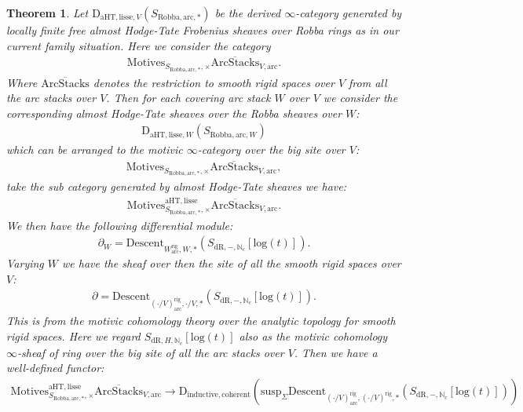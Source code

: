 \documentclass[12pt]{article}
\newtheorem{theorem}{Theorem}
\theoremstyle{definition}
\begin{document}
\begin{theorem}\label{theorem59}
Let $\mathrm{D}_{\mathrm{aHT},\mathrm{lisse},V}(S_{\mathrm{Robba},\mathrm{arc},*})$ be the derived $\infty$-category generated by locally finite free almost Hodge-Tate Frobenius sheaves over Robba rings as in our current family situation. Here we consider the category 
\begin{align}
\mathrm{Motives}_{S_{\mathrm{Robba},\mathrm{arc},*},\times}\overline{\mathrm{ArcStacks}}_{V,\mathrm{arc}}.
\end{align}
Where $\overline{\mathrm{ArcStacks}}$ denotes the restriction to smooth rigid spaces over $V$ from all the arc stacks over $V$. Then for each covering arc stack $W$ over $V$ we consider the corresponding almost Hodge-Tate sheaves over the Robba sheaves over $W$:
\begin{align}
\mathrm{D}_{\mathrm{aHT},\mathrm{lisse},W}(S_{\mathrm{Robba},\mathrm{arc},W})
\end{align}
which can be arranged to the motivic $\infty$-category over the big site over $V$:
\begin{align}
\mathrm{Motives}_{S_{\mathrm{Robba},\mathrm{arc},*},\times}\overline{\mathrm{ArcStacks}}_{V,\mathrm{arc}},
\end{align}
take the sub category generated by almost Hodge-Tate sheaves we have:
\begin{align}
\mathrm{Motives}^{\mathrm{aHT},\mathrm{lisse}}_{S_{\mathrm{Robba},\mathrm{arc},*},\times}\overline{\mathrm{ArcStacks}}_{V,\mathrm{arc}}.
\end{align}
We then have the following differential module:
\begin{align}
\partial_W=\mathrm{Descent}_{W^\mathrm{rig}_\mathrm{arc},W,*}(S_{\mathrm{dR},-,\mathbb{N}_c}[\mathrm{log}(t)]).
\end{align}
Varying $W$ we have the sheaf over then the site of all the smooth rigid spaces over $V$:
\begin{align}
\partial=\mathrm{Descent}_{(\cdot/V)^\mathrm{rig}_\mathrm{arc},\cdot/V,*}(S_{\mathrm{dR},-,\mathbb{N}_c}[\mathrm{log}(t)]).
\end{align}
This is from the motivic cohomology theory over the analytic topology for smooth rigid spaces. Here we regard $S_{\mathrm{dR},H,\mathbb{N}_c}[\mathrm{log}(t)]$ also as the motivic cohomology $\infty$-sheaf of ring over the big site of all the arc stacks over $V$. Then we have a well-defined functor:
\begin{align}
\mathrm{Motives}^{\mathrm{aHT},\mathrm{lisse}}_{S_{\mathrm{Robba},\mathrm{arc},*},\times}\overline{\mathrm{ArcStacks}}_{V,\mathrm{arc}}\longrightarrow \mathrm{D}_{\mathrm{inductive},\mathrm{coherent}}(\mathrm{susp}_\Sigma\mathrm{Descent}_{(\cdot/V)^\mathrm{rig}_\mathrm{arc},(\cdot/V)^\mathrm{rig},*}(S_{\mathrm{dR},-,\mathbb{N}_c}[\mathrm{log}(t)]))

\end{align}
\end{theorem}
\end{document}
